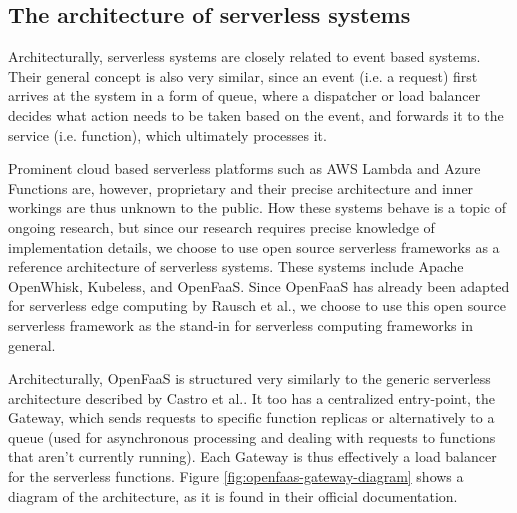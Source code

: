 \subsection{The architecture of serverless systems}
Architecturally, serverless systems are closely related to event based systems.
Their general concept is also very similar, since an event (i.e. a request) first arrives at the system in a form of queue, where a dispatcher or load balancer decides what action needs to be taken based on the event, and forwards it to the service (i.e. function), which ultimately processes it\cite{castroServerDeadLong2019}.

Prominent cloud based serverless platforms such as AWS Lambda\cite{aws-lambda} and Azure Functions\cite{azure-functions} are, however, proprietary and their precise architecture and inner workings are thus unknown to the public.
How these systems behave is a topic of ongoing research\cite{wangPeekingCurtainsServerless2018}, but since our research requires precise knowledge of implementation details, we choose to use open source serverless frameworks as a reference architecture of serverless systems.
These systems include Apache OpenWhisk\cite{openwhisk}, Kubeless\cite{kubeless}, and OpenFaaS\cite{openfaas}.
Since OpenFaaS has already been adapted for serverless edge computing by Rausch et al.\cite{rauschServerlessPlatformEdge}, we choose to use this open source serverless framework as the stand-in for serverless computing frameworks in general.

Architecturally, OpenFaaS is structured very similarly to the generic serverless architecture described by Castro et al.\cite{castroServerDeadLong2019}.
It too has a centralized entry-point, the Gateway, which sends requests to specific function replicas or alternatively to a queue (used for asynchronous processing and dealing with requests to functions that aren't currently running).
Each Gateway is thus effectively a load balancer for the serverless functions.
Figure \ref{fig:openfaas-gateway-diagram} shows a diagram of the architecture, as it is found in their official documentation\cite{openfaas-gateway}.

